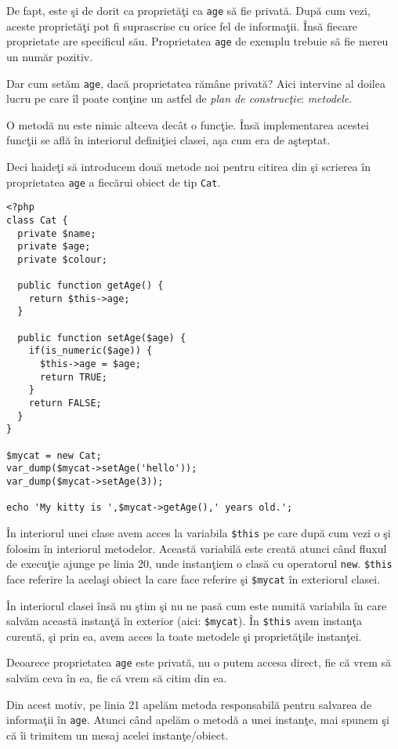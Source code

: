 De fapt, este şi de dorit ca proprietăţi ca \texttt{age} să fie privată. După cum vezi,
aceste proprietăţi pot fi suprascrise cu orice fel de informaţii. Însă fiecare proprietate
are specificul său. Proprietatea \texttt{age} de exemplu trebuie să fie mereu un număr pozitiv.

Dar cum setăm \texttt{age}, dacă proprietatea rămâne privată? Aici intervine al doilea lucru
pe care îl poate conţine un astfel de \textit{plan de construcţie}: \textsl{metodele}.

O metodă nu este nimic altceva decât o funcţie. Însă implementarea acestei funcţii se află
în interiorul definiţiei clasei, aşa cum era de aşteptat.

Deci haideţi să introducem două metode noi pentru citirea din şi scrierea în proprietatea
\texttt{age} a fiecărui obiect de tip \texttt{Cat}.

\begin{lstlisting}[title=Getters and Setters]
<?php
class Cat {
  private $name;
  private $age;
  private $colour;

  public function getAge() {
    return $this->age;
  }

  public function setAge($age) {
    if(is_numeric($age)) {
      $this->age = $age;
      return TRUE;
    }
    return FALSE;
  }
}

$mycat = new Cat;
var_dump($mycat->setAge('hello'));
var_dump($mycat->setAge(3));

echo 'My kitty is ',$mycat->getAge(),' years old.';
\end{lstlisting}

În interiorul unei clase avem acces la variabila \texttt{\$this} pe care
după cum vezi o şi folosim în interiorul metodelor. Această variabilă
este creată atunci când fluxul de execuţie ajunge pe linia 20, unde instanţiem
o clasă cu operatorul \texttt{new}. \texttt{\$this} face referire la acelaşi obiect la care face
referire şi \texttt{\$mycat} în exteriorul clasei.

În interiorul clasei însă nu ştim şi nu ne pasă cum este numită variabila
în care salvăm această instanţă în exterior (aici: \texttt{\$mycat}).
În \texttt{\$this} avem instanţa curentă,
şi prin ea, avem acces la toate metodele şi proprietăţile instanţei.

Deoarece proprietatea \texttt{age} este privată, nu o putem accesa direct,
fie că vrem să salvăm ceva în ea, fie că vrem să citim din ea.

Din acest motiv, pe linia 21 apelăm metoda responsabilă pentru salvarea
de informaţii în \texttt{age}. Atunci când apelăm o metodă a unei instanţe,
mai spunem şi că îi trimitem un mesaj acelei instanţe/obiect.

